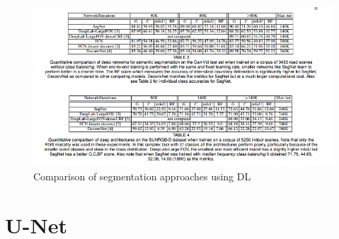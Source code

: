 \documentclass{article}
\begin{document}
\begin{figure}
    \centering
    \includegraphics[scale=0.5]{Segmentation_comparison.PNG}
    \caption{Comparison of segmentation approaches using DL}
    \label{fig:my_label}
\end{figure}

\section{U-Net}



\end{document}
